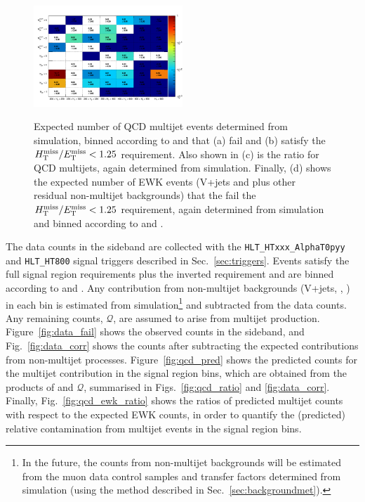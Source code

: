 \begin{figure}[!h]
{    \includegraphics[width=0.5\textwidth]{figures/qcd/v2/DataNoEwk_SigTrig_QCDPredDivEwk_NJet_vs_HT_bDPhigt0p5_Log}
  } \\
  \caption{Expected number of QCD multijet events determined from
    simulation, binned according to \njet and \scalht that (a) fail
    and (b) satisfy the $\mbox{$\mbox{$H_{\rm T}^{\rm miss}$} / \mbox{$E_\text{T}^{\rm miss}$}$} < 1.25$ requirement. Also shown in
    (c) is the ratio \rmhtmet for QCD multijets, again determined from
    simulation. Finally, (d) shows the expected number of EWK events
    (V+jets and \ttbar plus other residual non-multijet backgrounds)
    that the fail the $\mbox{$\mbox{$H_{\rm T}^{\rm miss}$} / \mbox{$E_\text{T}^{\rm miss}$}$} < 1.25$ requirement, again determined
    from simulation and binned according to \njet and \scalht.}
  \label{fig:qcd_plots}
\end{figure}

The data counts in the \mhtmet sideband are collected with the
\verb!HLT_HTxxx_AlphaT0pyy!  and \verb!HLT_HT800! signal triggers
described in Sec.~\ref{sec:triggers}. Events satisfy the full signal
region requirements plus the inverted \mhtmet requirement and are
binned according to \njet and \scalht. Any contribution from
non-multijet backgrounds (V+jets, \ttbar, \etc) in each bin is
estimated from simulation\footnote{In the future, the counts from
  non-multijet backgrounds will be estimated from the muon data
  control samples and transfer factors determined from simulation
  (using the method described in Sec.~\ref{sec:backgroundmet}).} and
subtracted from the data counts. Any remaining counts, $\mathcal{Q}$,
are assumed to arise from multijet production.
Figure~\ref{fig:data_fail} shows the observed counts in the \mhtmet
sideband, and Fig.~\ref{fig:data_corr} shows the counts after
subtracting the expected contributions from non-multijet processes.
Figure~\ref{fig:qcd_pred} shows the predicted counts for the multijet
contribution in the signal region bins, which are obtained from the
products of \rmhtmet and $\mathcal{Q}$, summarised in
Figs.~\ref{fig:qcd_ratio} and \ref{fig:data_corr}. Finally,
Fig.~\ref{fig:qcd_ewk_ratio} shows the ratios of predicted multijet
counts with respect to the expected EWK counts, in order to quantify
the (predicted) relative contamination from multijet events in the
signal region bins.

